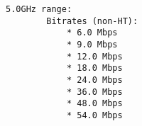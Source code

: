 \begin{lstlisting}
5.0GHz range:
		Bitrates (non-HT):
			* 6.0 Mbps
			* 9.0 Mbps
			* 12.0 Mbps
			* 18.0 Mbps
			* 24.0 Mbps
			* 36.0 Mbps
			* 48.0 Mbps
			* 54.0 Mbps
\end{lstlisting}
